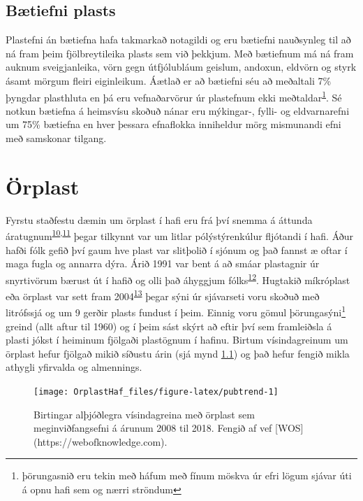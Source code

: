 \documentclass[icelandic,]{book}
\let\rmarkdownfootnote\footnote%
\def\footnote{\protect\rmarkdownfootnote}
\begin{document}
\hypertarget{btiefni-plasts}{%
\section*{Bætiefni plasts}\label{btiefni-plasts}}

Plastefni án bætiefna hafa takmarkað notagildi og eru bætiefni nauðsynleg til að ná fram þeim fjölbreytileika plasts sem við þekkjum. Með bætiefnum má ná fram auknum sveigjanleika, vörn gegn útfjólubláum geislum, andoxun, eldvörn og styrk ásamt mörgum fleiri eiginleikum. Áætlað er að bætiefni séu að meðaltali 7\% þyngdar plasthluta en þá eru vefnaðarvörur úr plastefnum ekki meðtaldar\textsuperscript{\protect\hyperlink{ref-geyer2017production}{1}}. Sé notkun bætiefna á heimsvísu skoðuð nánar eru mýkingar-, fylli- og eldvarnarefni um 75\% bætiefna en hver þessara efnaflokka inniheldur mörg mismunandi efni með samskonar tilgang.

\hypertarget{orplast}{%
\chapter{Örplast}\label{orplast}}

Fyrstu staðfestu dæmin um örplast í hafi eru frá því snemma á áttunda áratugnum\textsuperscript{\protect\hyperlink{ref-Waters1972}{10},\protect\hyperlink{ref-Colton1974}{11}} þegar tilkynnt var um litlar pólýstýrenkúlur fljótandi í hafi. Áður hafði fólk gefið því gaum hve plast var slitþolið í sjónum og það fannst æ oftar í maga fugla og annarra dýra. Árið 1991 var bent á að smáar plastagnir úr snyrtivörum bærust út í hafið og olli það áhyggjum fólks\textsuperscript{\protect\hyperlink{ref-zitko1991another}{12}}. Hugtakið míkróplast eða örplast var sett fram 2004\textsuperscript{\protect\hyperlink{ref-Thompson2004lost}{13}} þegar sýni úr sjávarseti voru skoðuð með litrófssjá og um 9 gerðir plasts fundust í þeim. Einnig voru gömul þörungasýni\footnote{þörungasnið eru tekin með háfum með fínum möskva úr efri lögum sjávar úti á opnu hafi sem og nærri ströndum} greind (allt aftur til 1960) og í þeim sást skýrt að eftir því sem framleiðsla á plasti jókst í heiminum fjölgaði plastögnum í hafinu. Birtum vísindagreinum um örplast hefur fjölgað mikið síðustu árin (sjá mynd \ref{fig:pubtrend}) og það hefur fengið mikla athygli yfirvalda og almennings.

\begin{figure}

{\centering \texttt{[image: OrplastHaf\_files/figure-latex/pubtrend-1]} 

}

\caption{Birtingar alþjóðlegra vísindagreina með örplast sem meginviðfangsefni á árunum 2008 til 2018. Fengið af vef [WOS](https://webofknowledge.com).}\label{fig:pubtrend}
\end{figure}
\end{document}
